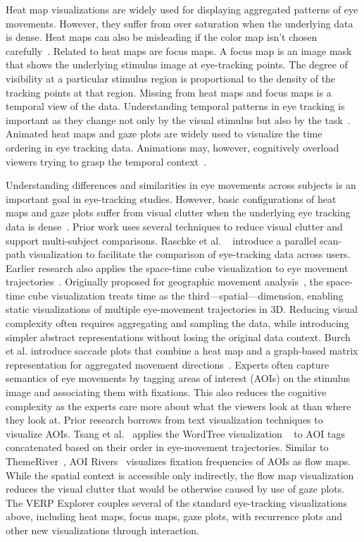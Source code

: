 \documentclass{sigchi}
\begin{document}
Heat map visualizations are widely used for displaying aggregated patterns
of eye movements. However, they suffer from over saturation when the
underlying data is dense.  Heat maps can also be misleading if the color
map isn’t chosen carefully~\cite{Borland_2007}. Related to heat maps are
focus maps.  A focus map is an image mask that shows the underlying
stimulus image at eye-tracking points.  The degree of visibility at a
particular stimulus region is proportional to the density of the tracking
points at that region.  Missing from heat maps and focus maps is a temporal
view of the data. Understanding temporal patterns in eye tracking is
important as they change not only by the visual stimulus but also by the
task~\cite{Yarbus_1967}. Animated heat maps and gaze plots are widely used
to visualize the time ordering in eye tracking data. Animations may,
however, cognitively overload viewers trying to grasp the temporal
context~\cite{TVERSKY_2002}. 

Understanding differences and similarities in eye movements across subjects
is an important goal in eye-tracking studies. However, basic configurations
of heat maps and gaze plots suffer from visual clutter when the underlying
eye tracking data is dense~\cite{Blascheck_2014}. Prior work uses several
techniques to reduce visual clutter and support multi-subject comparisons.
Raschke et al. ~\cite{Raschke_2012} introduce a parallel scan-path
visualization to facilitate the comparison of eye-tracking data across
users.  Earlier research also applies the space-time cube visualization to
eye movement trajectories~\cite{Li_2010,Kurzhals_2013}. Originally proposed
for geographic movement analysis~\cite{Hagerstrand_1970,Kraak_2003}, the
space-time cube visualization treats time as the third—spatial—dimension,
enabling static visualizations of multiple eye-movement trajectories in 3D.
Reducing visual complexity often requires aggregating and sampling the
data, while introducing simpler abstract representations without losing the
original data context.  Burch et al.  introduce saccade plots that combine
a heat map  and a graph-based matrix representation for aggregated movement
directions~\cite{Burch_2014b}. Experts often capture semantics of eye
movements by tagging areas of interest (AOIs) on the stimulus image and
associating them with fixations.  This also reduces the cognitive
complexity as the experts care more about what the viewers look at than
where they look at. Prior research borrows from text visualization
techniques to visualize AOIs. Tsang et al.~\cite{Tsang_2010} applies the
WordTree visualization ~\cite{Wattenberg_2008} to AOI tags concatenated
based on their order in eye-movement trajectories. Similar to
ThemeRiver~\cite{Havre_2000}, AOI Rivers~\cite{Burch_2013} visualizes
fixation frequencies of AOIs as flow maps. While the spatial context is
accessible only indirectly, the flow map visualization reduces the visual
clutter that would be otherwise caused by use of gaze plots. The VERP
Explorer couples several of the standard eye-tracking visualizations above,
including heat maps, focus maps, gaze plots, with recurrence plots and
other new visualizations through interaction. 
	
\end{document}
